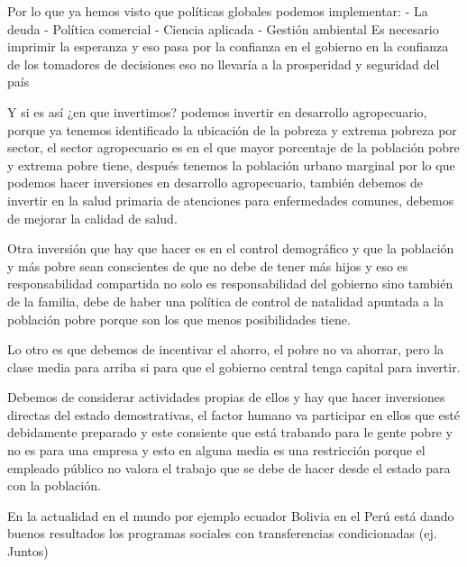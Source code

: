 \documentclass[
  a4paper,
]{article}
\begin{document}
Por lo que ya hemos visto que políticas globales podemos implementar: -
La deuda - Política comercial - Ciencia aplicada - Gestión ambiental Es
necesario imprimir la esperanza y eso pasa por la confianza en el
gobierno en la confianza de los tomadores de decisiones eso no llevaría
a la prosperidad y seguridad del país

Y si es así ¿en que invertimos? podemos invertir en desarrollo
agropecuario, porque ya tenemos identificado la ubicación de la pobreza
y extrema pobreza por sector, el sector agropecuario es en el que mayor
porcentaje de la población pobre y extrema pobre tiene, después tenemos
la población urbano marginal por lo que podemos hacer inversiones en
desarrollo agropecuario, también debemos de invertir en la salud
primaria de atenciones para enfermedades comunes, debemos de mejorar la
calidad de salud.

Otra inversión que hay que hacer es en el control demográfico y que la
población y más pobre sean conscientes de que no debe de tener más hijos
y eso es responsabilidad compartida no solo es responsabilidad del
gobierno sino también de la familia, debe de haber una política de
control de natalidad apuntada a la población pobre porque son los que
menos posibilidades tiene.

Lo otro es que debemos de incentivar el ahorro, el pobre no va ahorrar,
pero la clase media para arriba si para que el gobierno central tenga
capital para invertir.

Debemos de considerar actividades propias de ellos y hay que hacer
inversiones directas del estado demostrativas, el factor humano va
participar en ellos que esté debidamente preparado y este consiente que
está trabando para le gente pobre y no es para una empresa y esto en
alguna media es una restricción porque el empleado público no valora el
trabajo que se debe de hacer desde el estado para con la población.

En la actualidad en el mundo por ejemplo ecuador Bolivia en el Perú está
dando buenos resultados los programas sociales con transferencias
condicionadas (ej. Juntos)
\end{document}

